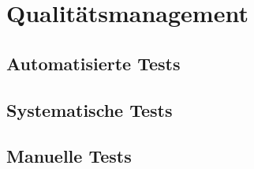 \chapter{Qualitätsmanagement}
	\section{Automatisierte Tests}
	
	
	\section{Systematische Tests}
	
	
	\section{Manuelle Tests}
